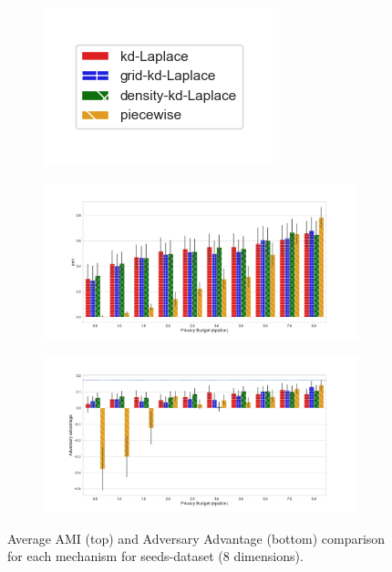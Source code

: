 \begin{figure}[H]
  \centering
  \begin{subfigure}{0.30\textwidth}
    \includegraphics[width=\textwidth]{Results/kd-laplace/ami_bar_comparison_legend.png}
  \end{subfigure}
  \begin{subfigure}{1\textwidth}
    \includegraphics[width=1\textwidth]{Results/nd-laplace/ami_seeds-dataset_comparison.png}
  \end{subfigure}
  \begin{subfigure}{1\textwidth}
    \includegraphics[width=1\textwidth]{Results/nd-laplace/attack_adv_seeds-dataset_comparison.png}
  \end{subfigure}
  \caption{Average AMI (top) and Adversary Advantage (bottom) comparison for each mechanism for seeds-dataset (8 dimensions).}
  \label{fig:utility_seeds-dataset_comparison_nd_plot}
\end{figure}
